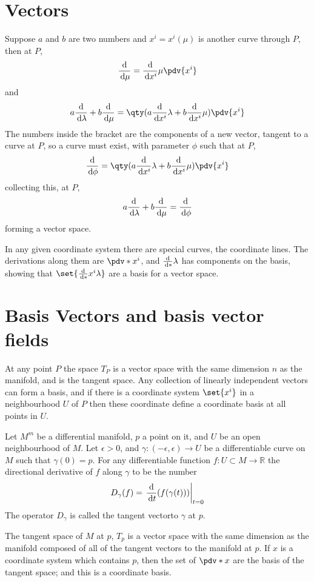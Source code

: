 \section{Vectors}
\label{sec:vectors}

Suppose $a$ and $b$ are two numbers and $x^i = x^i(\mu)$ is another curve through $P$, then at $P$,
\[ \dv{\mu} = \dv{x^i}{\mu} \pdv{x^i} \]
and
\[ a \dv{\lambda} + b\dv{\mu} = \qty( a \dv{x^i}{\lambda} + b \dv{x^i}{\mu} ) \pdv{x^i} \]
The numbers inside the bracket are the components of a new vector, tangent to a curve at $P$, so a curve must exist, with parameter $\phi$ such that at $P$,
\[ \dv{\phi} = \qty( a \dv{x^i}{\lambda} + b \dv{x^i}{\mu} ) \pdv{x^i} \]
collecting this, at $P$,
\[ a \frac{\mathrm{d}}{\,\mathrm{d} \lambda} + b \frac{\mathrm{d}}{\,\mathrm{d} \mu} = \frac{\mathrm{d}}{\,\mathrm{d} \phi} \]
forming a vector space.

In any given coordinate system there are special curves, the
coordinate lines. The derivations along them are $\pdv*{x^i}$, and
$\frac{\mathrm{d}}{\,\mathrm{d} *}{\lambda}$ has components on the basis, showing that
$\set{\dv*{x^i}{\lambda}}$ are a basis for a vector space.

\section{Basis Vectors and basis vector fields}
\label{sec:basis-vectors-basis}

At any point $P$ the space $T_P$ is a vector space with the same
dimension $n$ as the manifold, and is the tangent space. Any
collection of linearly independent vectors can form a basis, and if
there is a coordinate system $\set{x^i}$ in a neighbourhood $U$ of $P$
then these coordinate define a coordinate basis at all points in $U$.

\begin{definition}
  Let $M^m$ be a differential manifold, $p$ a point on it, and $U$ be
  an open neighbourhood of $M$. Let $\epsilon>0$, and $\gamma :
  (-\epsilon, \epsilon) \to U$ be a differentiable curve on $M$ such
  that $\gamma(0) = p$. For any differentiable function $f:U \subset M
  \to \mathbb{R}$ the directional derivative of $f$ along $\gamma$ to
  be the number
  \[ D_{\gamma}(f) = \left. \frac{\mathrm{d}}{\,\mathrm{d} t}( f (\gamma(t) ) ) \right|_{t=0} \] The
  operator $D_{\gamma}$ is called the tangent vectorto $\gamma$ at
  $p$.
\end{definition}
\begin{definition}
  The tangent space of $M$ at $p$, $T_p$ is a vector space with the
  same dimension as the manifold composed of all of the tangent
  vectors to the manifold at $p$. If $x$ is a coordinate system which
  contains $p$, then the set of $\pdv*{x}$ are the basis of the tangent
  space; and this is a coordinate basis.
\end{definition}

